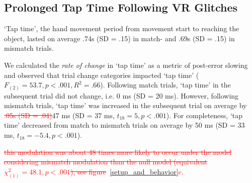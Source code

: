 \subsection{Prolonged Tap Time Following VR Glitches}

\textcolor{n}{}

`Tap time', the hand movement period from movement start to reaching the object, lasted on average .74s (SD = .15) in match- and .69s (SD = .15) in mismatch trials. 

We calculated the \textit{rate of change} in `tap time' as a metric of post-error slowing \textcolor{n}{and observed that trial change categories impacted `tap time' ($F_{(2)} = 53.7, p < .001, R^2 = .66$). Following match trials, `tap time' in the subsequent trial did not change, i.e. 0 ms (SD = 20 ms). However, following mismatch trials, `tap time' was increased in the subsequent trial on average by} \textcolor{red}{\st{.05s (SD = .04)}}\textcolor{n}{47 ms (SD = 37 ms, $t_{18} = 5, p < .001$)}. \textcolor{n}{For completeness, `tap time' decreased from match to mismatch trials on average by 50 ms (SD = 33 ms, $t_{18} = -5.4, p < .001$).}

\textcolor{red}{\st{this modulation was about 48 times more likely to occur under the model considering mismatch modulation than the null model (equivalent ${\chi}^2_{(1)} = 48.1, p<.001$), see figure}~\ref{setup_and_behavior}c.}











